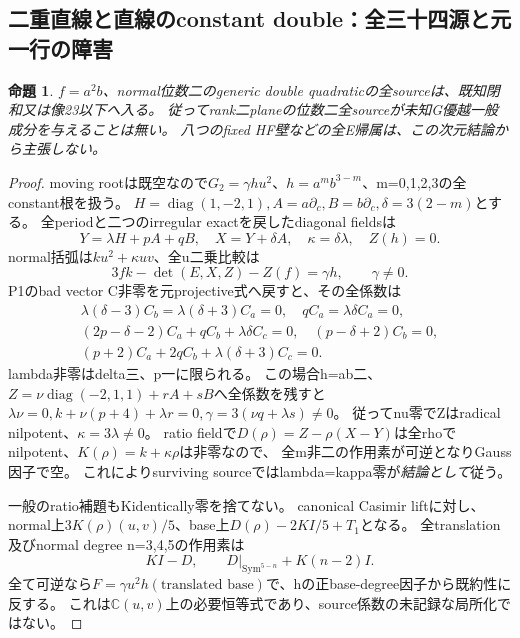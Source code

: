 \documentclass[a4paper,11pt]{ltjsarticle}
\newtheorem{proposition}{命題}[section]
\theoremstyle{definition}
\begin{document}
\subsection{二重直線と直線のconstant double：全三十四源と元一行の障害}
\begin{proposition}\label{prop:plane-double-line-m2-double-all-G}
$f=a^2b$、normal位数二のgeneric double quadraticの全sourceは、既知閉和又は像23以下へ入る。
従ってrank二planeの位数二全sourceが未知G優越一般成分を与えることは無い。
八つのfixed HF壁などの全E帰属は、この次元結論から主張しない。
\end{proposition}
\begin{proof}
moving rootは既空なので$G_2=\gamma h u^2$、$h=a^mb^{3-m}$、m=0,1,2,3の全constant根を扱う。
$H=\operatorname{diag}(1,-2,1),A=a\partial_c,B=b\partial_c,\delta=3(2-m)$とする。
全periodと二つのirregular exactを戻したdiagonal fieldsは
\[
 Y=\lambda H+pA+qB,\quad X=Y+\delta A,\quad
 \kappa=\delta\lambda,\quad Z(h)=0.
\]
normal括弧は$ku^2+\kappa uv$、全u二乗比較は
\[
 3fk-\det(E,X,Z)-Z(f)=\gamma h,\qquad\gamma\ne0.
\]
P1のbad vector C非零を元projective式へ戻すと、その全係数は
\[
\begin{gathered}
 \lambda(\delta-3)C_b=\lambda(\delta+3)C_a=0,\quad qC_a=\lambda\delta C_a=0,\\
 (2p-\delta-2)C_a+qC_b+\lambda\delta C_c=0,\quad
 (p-\delta+2)C_b=0,\\
 (p+2)C_a+2qC_b+\lambda(\delta+3)C_c=0.
\end{gathered}
\]
lambda非零はdelta三、p一に限られる。
この場合h=ab二、$Z=\nu\operatorname{diag}(-2,1,1)+rA+sB$へ全係数を残すと
$\lambda\nu=0,k+\nu(p+4)+\lambda r=0,\gamma=3(\nu q+\lambda s)\ne0$。
従ってnu零でZはradical nilpotent、$\kappa=3\lambda\ne0$。
ratio fieldで$D(\rho)=Z-\rho(X-Y)$は全rhoでnilpotent、$K(\rho)=k+\kappa\rho$は非零なので、
全m非二の作用素が可逆となりGauss因子で空。
これによりsurviving sourceではlambda=kappa零が\emph{結論として}従う。

一般のratio補題もKidentically零を捨てない。
canonical Casimir liftに対し、normal上$3K(\rho)(u,v)/5$、base上$D(\rho)-2KI/5+T_1$となる。
全translation及びnormal degree n=3,4,5の作用素は
\[
 KI-D,\qquad D|_{\operatorname{Sym}^{5-n}}+K(n-2)I.
\]
全て可逆なら$F=\gamma u^2h(\text{translated base})$で、hの正base-degree因子から既約性に反する。
これは$\mathbb C(u,v)$上の必要恒等式であり、source係数の未記録な局所化ではない。


\end{proof}
\end{document}

